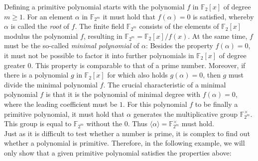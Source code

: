 Defining a primitive polynomial starts with the polynomial $f$ in $\mathbb{F}_2[x]$ of degree $m\ge1$. For an element $\alpha$ in $\mathbb{F}_{2^m}$ it must hold that $f(\alpha)=0$ is satisfied, whereby $\alpha$ is called the \textit{root} of $f$. The finite field $\mathbb{F}_{2^m}$ consists of the elements of $\mathbb{F}_2[x]$ modulus the polynomial $f$, resulting in $\mathbb{F}_{2^m}=\mathbb{F}_2[x]/f(x)$. \cite[p.11]{Smart.2016} At the same time, $f$ must be the so-called \textit{minimal polynomial} of $\alpha$: Besides the property $f(\alpha)=0$, it must not be possible to factor it into further polynomials in $\mathbb{F}_2[x]$ of degree greater $0$. This property is comparable to that of a prime number. Moreover, if there is a polynomial $g$ in $\mathbb{F}_2[x]$ for which also holds $g(\alpha)=0$, then $g$ must divide the minimal polynomial $f$. The crucial characteristic of a minimal polynomial $f$ is that it is the polynomial of minimal degree with $f(\alpha)=0$, where the leading coefficient must be $1$. For this polynomial $f$ to be finally a primitive polynomial, it must hold that $\alpha$ generates the multiplicative group $\mathbb{F}_{2^m}^\times$. This group is equal to $\mathbb{F}_{2^m}$ without the $0$. Thus $\langle\alpha\rangle=\mathbb{F}_{2^m}^\times$ must hold. \cite[pp. 23, 31, 89]{Lidl.1997} \\

Just as it is difficult to test whether a number is prime, it is complex to find out whether a polynomial is primitive. \cite[p. 431]{Schneier.2006} Therefore, in the following example, we will only show that a given primitive polynomial satisfies the properties above: \\

